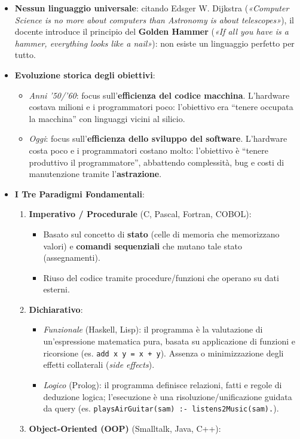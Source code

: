 \documentclass[11pt,a4paper,oneside]{report}
\newcommand{\passthrough}[1]{#1}
\providecommand{\tightlist}{\setlength{\itemsep}{0pt}\setlength{\parskip}{0pt}}
\begin{document}
\begin{itemize}
\tightlist
\item
  \textbf{Nessun linguaggio universale}: citando Edsger W. Dijkstra
  (\emph{«Computer Science is no more about computers than Astronomy is
  about telescopes»}), il docente introduce il principio del
  \textbf{Golden Hammer} (\emph{«If all you have is a hammer, everything
  looks like a nail»}): non esiste un linguaggio perfetto per tutto.
\item
  \textbf{Evoluzione storica degli obiettivi}:

  \begin{itemize}
  \tightlist
  \item
    \emph{Anni '50/'60}: focus sull'\textbf{efficienza del codice
    macchina}. L'hardware costava milioni e i programmatori poco:
    l'obiettivo era ``tenere occupata la macchina'' con linguaggi vicini
    al silicio.
  \item
    \emph{Oggi}: focus sull'\textbf{efficienza dello sviluppo del
    software}. L'hardware costa poco e i programmatori costano molto:
    l'obiettivo è ``tenere produttivo il programmatore'', abbattendo
    complessità, bug e costi di manutenzione tramite
    l'\textbf{astrazione}.
  \end{itemize}
\item
  \textbf{I Tre Paradigmi Fondamentali}:

  \begin{enumerate}
  \def\labelenumi{\arabic{enumi}.}
  \tightlist
  \item
    \textbf{Imperativo / Procedurale} (C, Pascal, Fortran, COBOL):

    \begin{itemize}
    \tightlist
    \item
      Basato sul concetto di \textbf{stato} (celle di memoria che
      memorizzano valori) e \textbf{comandi sequenziali} che mutano tale
      stato (assegnamenti).
    \item
      Riuso del codice tramite procedure/funzioni che operano su dati
      esterni.
    \end{itemize}
  \item
    \textbf{Dichiarativo}:

    \begin{itemize}
    \tightlist
    \item
      \emph{Funzionale} (Haskell, Lisp): il programma è la valutazione
      di un'espressione matematica pura, basata su applicazione di
      funzioni e ricorsione (es.
      \passthrough{\lstinline!add x y = x + y!}). Assenza o
      minimizzazione degli effetti collaterali (\emph{side effects}).
    \item
      \emph{Logico} (Prolog): il programma definisce relazioni, fatti e
      regole di deduzione logica; l'esecuzione è una
      risoluzione/unificazione guidata da query (es.
      \passthrough{\lstinline!playsAirGuitar(sam) :- listens2Music(sam).!}).
    \end{itemize}
  \item
    \textbf{Object-Oriented (OOP)} (Smalltalk, Java, C++):


\end{enumerate}
\end{itemize}
\end{document}

